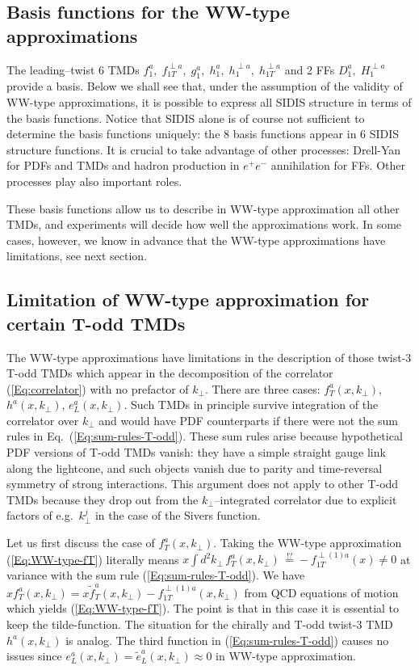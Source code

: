 \documentclass[a4paper,11pt]{article}
\def\kperp{k_\perp}
\begin{document}
\subsection{Basis functions for the WW-type approximations}
\label{Sec-3.7:basis}

The leading--twist 6 TMDs 
$f_1^a, \; f_{1T}^{\perp a}, \; g_1^a, \; h_1^a, \;h_1^{\perp a},\; h_{1T}^{\perp a}$
and 2 FFs $D_1^a, \; H_1^{\perp a}$ provide a basis.
Below we shall see that, under the assumption of the validity of WW-type 
approximations, it is possible to express all SIDIS structure
in terms of the basis functions. 
Notice that SIDIS alone is of course not sufficient to determine the basis
functions uniquely: the 8 basis functions appear in 6 SIDIS structure functions.
It is crucial to take advantage of other processes: Drell-Yan for PDFs and TMDs
and hadron production in $e^+e^-$ annihilation for FFs. Other processes 
play also important roles.

These basis functions allow us to describe in WW-type approximation all other 
TMDs, and experiments will decide how well the approximations work.
In some cases, however, we know in advance that the WW-type approximations 
have limitations, see next section.



\subsection{Limitation of WW-type approximation for certain T-odd TMDs}
\label{Sec-3.8:limitations}

The WW-type approximations have limitations in the description of 
those twist-3 T-odd TMDs which appear in the decomposition of the 
correlator (\ref{Eq:correlator}) with no prefactor of $\kperp$.
There are three cases: $f_T^a(x,k_\perp)$, $h^a(x,\kperp)$, $e_L^a(x,\kperp)$.
Such TMDs in principle survive integration of the correlator over $\kperp$
and would have PDF counterparts if there were not the sum rules in 
Eq.~(\ref{Eq:sum-rules-T-odd}). These sum rules arise because hypothetical
PDF versions of T-odd TMDs vanish: they have a simple straight gauge link
along the lightcone, and such objects vanish due to parity and time-reversal 
symmetry of strong interactions. This argument does not apply to other T-odd 
TMDs because they drop out from the $\kperp$--integrated correlator due to 
explicit factors of e.g.\ $\kperp^j$ in the case of the Sivers function.

Let us first discuss the case of $f_T^a(x,k_\perp)$. Taking the  
WW-type approximation (\ref{Eq:WW-type-fT}) literally means
$x\int d^2 k_\perp\,f_T^a(x,k_\perp)\,\stackrel{!?}{=}
-f_{1T}^{\perp(1)a}(x)\neq0$ 
at variance with the sum rule (\ref{Eq:sum-rules-T-odd}). We 
have $xf_T^a(x,k_\perp)=x\tilde{f}_T^a(x,k_\perp)-f_{1T}^{\perp(1)a}(x,k_\perp)$ 
from QCD equations of motion \cite{Bacchetta:2006tn} which yields
(\ref{Eq:WW-type-fT}). The point is that in this case it is 
essential to keep the tilde-function. 
The situation for the chirally and T-odd twist-3 
TMD $h^a(x,k_\perp)$ is analog. The third 
function in (\ref{Eq:sum-rules-T-odd}) causes no issues since 
$e_L^a(x,k_\perp)=\tilde{e}_L^a(x,k_\perp)\approx0$ in WW-type approximation.
\end{document}
